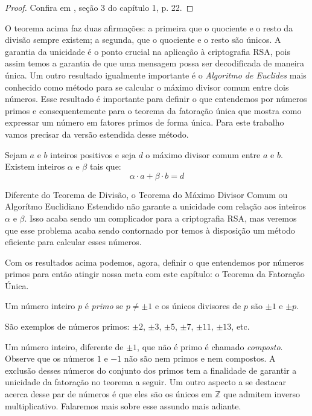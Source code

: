 \begin{proof}
Confira em \cite{cou:2014}, se\c{c}\~ao 3 do cap\'itulo 1, p. 22.
\end{proof}

O teorema acima faz duas afirma\c{c}\~oes: a primeira que o quociente e o resto da divis\~ao sempre existem; a segunda, que o quociente e o resto s\~ao \'unicos. A garantia da unicidade \'e o ponto crucial na aplica\c{c}\~ao \`a criptografia RSA, pois assim temos a garantia de que uma mensagem possa ser decodificada de maneira \'unica. Um outro resultado 
igualmente importante \'e o \textit{Algoritmo de Euclides} mais conhecido como m\'etodo para se calcular o m\'aximo divisor comum entre dois n\'umeros. Esse resultado \'e importante para definir o que entendemos por n\'umeros primos e consequentemente para o teorema da fatora\c{c}\~ao \'unica que mostra como expressar um n\'umero em fatores primos de forma \'unica. Para este trabalho vamos precisar da vers\~ao estendida desse m\'etodo.

\begin{Th}\label{alg.eucl.est.}
Sejam $a$ e $b$ inteiros positivos e seja $d$ o m\'aximo divisor comum entre $a$ e $b$. Existem
inteiros $\alpha$ e $\beta$ tais que:
	$$\alpha\cdot a+\beta\cdot b=d$$
\end{Th}

Diferente do Teorema de Divis\~ao, o Teorema do M\'aximo Divisor Comum ou  Algor\'itmo Euclidiano Estendido n\~ao garante a unicidade com rela\c{c}\~ao aos inteiros $\alpha$ e $\beta$. Isso acaba sendo um complicador para a criptografia RSA, mas veremos que esse problema acaba sendo contornado por temos \`{a} disposi\c{c}\~ao um m\'etodo eficiente para calcular esses n\'umeros.

Com os resultados acima podemos, agora, definir o que entendemos por n\'umeros primos para ent\~ao atingir nossa meta com este 
cap\'itulo: o Teorema da Fatora\c{c}\~ao \'Unica.

\begin{Df}
Um n\'umero inteiro $p$ \'e \textit{primo} se $p\neq \pm 1$ e os \'unicos divisores de $p$ s\~ao $\pm 1$ e $\pm p$. 
\end{Df} 

S\~ao exemplos de n\'umeros primos: $\pm 2$, $\pm 3$, $\pm 5$, $\pm 7$, $\pm 11$, $\pm 13$, etc.

Um n\'umero inteiro, diferente de $\pm 1$, que n\~ao \'e primo \'e chamado \textit{composto}. Observe que os n\'umeros $1$ e $-1$ n\~ao s\~ao nem primos e nem compostos. A exclus\~ao desses n\'umeros do conjunto dos primos tem a finalidade de garantir a unicidade da fatora\c{c}\~ao no teorema a seguir. Um outro aspecto a se destacar acerca desse par de n\'umeros \'e que eles s\~ao os \'unicos em $\mathbb{Z}$ que admitem inverso multiplicativo. Falaremos mais sobre esse assundo mais adiante.


